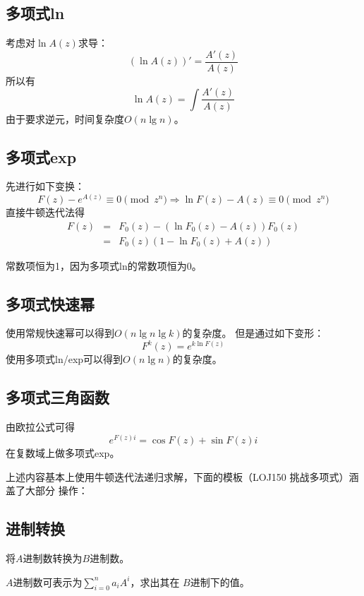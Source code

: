 \subsection{多项式ln}
考虑对$\ln A(z)$求导：
\begin{displaymath}
    (\ln A(z))'=\frac{A'(z)}{A(z)}
\end{displaymath}
所以有
\begin{displaymath}
    \ln A(z)=\int \frac{A'(z)}{A(z)}
\end{displaymath}
由于要求逆元，时间复杂度$O(n \lg n)$。
\subsection{多项式exp}
先进行如下变换：
\begin{displaymath}
    F(z)-e^{A(z)}\equiv 0 \pmod{z^n}
    \Rightarrow \ln F(z)-A(z)\equiv 0 \pmod{z^n}
\end{displaymath}
直接牛顿迭代法得
\begin{eqnarray*}
    F(z)&=&F_0(z)-(\ln F_0(z)-A(z))F_0(z)\\
    &=&F_0(z)(1-\ln F_0(z)+A(z))
\end{eqnarray*}

常数项恒为1，因为多项式ln的常数项恒为0。
\subsection{多项式快速幂}
使用常规快速幂可以得到$O(n\lg n\lg k)$的复杂度。
但是通过如下变形：
\begin{displaymath}
    F^k(z)=e^{k \ln F(z)}
\end{displaymath}
使用多项式ln/exp可以得到$O(n\lg n)$的复杂度。
\subsection{多项式三角函数}
由欧拉公式可得
\begin{displaymath}
    e^{F(z)i}=\cos F(z)+\sin F(z) i
\end{displaymath}
在复数域上做多项式exp。

上述内容基本上使用牛顿迭代法递归求解，下面的模板（LOJ150 挑战多项式）涵盖了大部分
操作：


\subsection{进制转换}
将$A$进制数转换为$B$进制数。

$A$进制数可表示为$\displaystyle \sum_{i=0}^n{a_iA^i}$，求出其在
$B$进制下的值。


